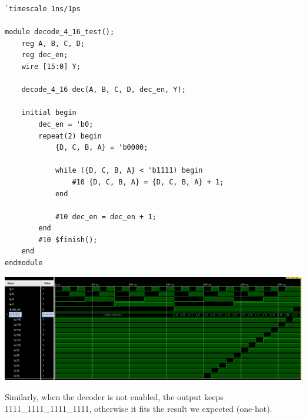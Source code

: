 \documentclass[onecolumn, oneside, ctexart]{SUSTechHomework}
\begin{document}
\begin{lstlisting}
`timescale 1ns/1ps

module decode_4_16_test();
    reg A, B, C, D;
    reg dec_en;
    wire [15:0] Y;

    decode_4_16 dec(A, B, C, D, dec_en, Y);

    initial begin
        dec_en = 'b0;
        repeat(2) begin
            {D, C, B, A} = 'b0000;

            while ({D, C, B, A} < 'b1111) begin
                #10 {D, C, B, A} = {D, C, B, A} + 1;
            end

            #10 dec_en = dec_en + 1;
        end
        #10 $finish();
    end
endmodule
\end{lstlisting}
\vspace{-2em}
\centerline{\includegraphics[width=\textwidth]{fig/t2}}
\par Similarly, when the decoder is not enabled, the output keeps 1111\_1111\_1111\_1111, otherwise it fits the result we expected (one-hot).
\end{document}
